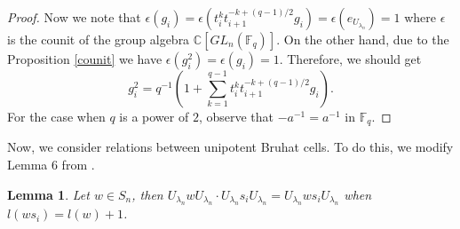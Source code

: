 \documentclass[12pt,reqno]{amsart}
\newtheorem{lem}[thm]{Lemma}
\theoremstyle{definition}
\theoremstyle{remark}
\newtheorem{rem}[thm]{Remark}
\numberwithin{equation}{section}
\newcommand{\CC}{\mathbb{C}}
\newcommand{\GL}[1]{GL_{#1}(\mathbb{F}_q)}
\def\IM#1{\textcolor[rgb]{0.00,0.00,0.75}{[I: #1]}}
\begin{document}
\begin{proof}
Now we note that $\epsilon(g_i)=\epsilon(t_i^k t_{i+1}^{-k+(q-1)/2}g_i)=\epsilon(e_{U_{\lambda_n}})=1$ where $\epsilon$ is the counit of the group algebra $\CC[\GL{n}]$. On the other hand, due to the Proposition \ref{counit} we have $\epsilon(g_i^2)=\epsilon(g_i)=1$. Therefore, we should get
\[
g_i^2=q^{-1}(1 + \sum_{k=1}^{q-1}t_i^kt_{i+1}^{-k+(q-1)/2} g_i).
\]
For the case when $q$ is a power of $2$, observe that $-a^{-1}=a^{-1}$ in $\mathbb{F}_q$.
\end{proof}



Now, we consider relations between unipotent Bruhat cells. To do this, we modify Lemma 6 from \cite{DB}.

\begin{lem}\label{word_multiplication}
    Let $w\in S_n$, then $U_{\lambda_n} w U_{\lambda_n} \cdot U_{\lambda_n} s_iU_{\lambda_n} = U_{\lambda_n} ws_i U_{\lambda_n}$ when $l(ws_i)=l(w)+1$.
\end{lem}
\end{document}
